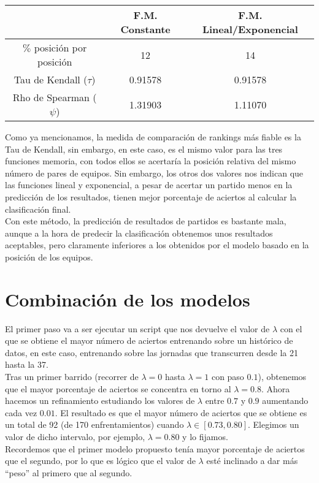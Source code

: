 \begin{center}
	\begin{tabular}{|c|c|c|}
	\hline  & F.M. Constante & F.M. Lineal/Exponencial \\ 
	\hline $\%$ posición por posición & 12 & 14 \\ 
	\hline Tau de Kendall ($\tau$) & 0.91578 & 0.91578 \\ 
	\hline Rho de Spearman ($\psi$) & 1.31903 & 1.11070 \\ 
	\hline 
\end{tabular} 
\end{center}

Como ya mencionamos, la medida de comparación de rankings más fiable es la Tau de Kendall, sin embargo, en este caso, es el mismo valor para las tres funciones memoria, con todos ellos se acertaría la posición relativa del mismo número de pares de equipos. Sin embargo, los otros dos valores nos indican que las funciones lineal y exponencial, a pesar de acertar un partido menos en la predicción de los resultados, tienen mejor porcentaje de aciertos al calcular la clasificación final.\\

Con este método, la predicción de resultados de partidos es bastante mala, aunque a la hora de predecir la clasificación obtenemos unos resultados aceptables, pero claramente inferiores a los obtenidos por el modelo basado en la posición de los equipos. 

\section{Combinación de los modelos}
El primer paso va a ser ejecutar un script que nos devuelve el valor de $\lambda$ con el que se obtiene el mayor número de aciertos entrenando sobre un histórico de datos, en este caso, entrenando sobre las jornadas que transcurren desde la 21 hasta la 37.\\

Tras un primer barrido (recorrer de $\lambda=0$ hasta $\lambda=1$ con paso $0.1$), obtenemos que el mayor porcentaje de aciertos se concentra en torno al $\lambda=0.8$. Ahora hacemos un refinamiento estudiando los valores de $\lambda$ entre $0.7$ y $0.9$ aumentando cada vez $0.01$. El resultado es que el mayor número de aciertos que se obtiene es un total de 92 (de 170 enfrentamientos) cuando $\lambda \in [0.73,0.80]$. Elegimos un valor de dicho intervalo, por ejemplo, $\lambda=0.80$ y lo fijamos. \\
Recordemos que el primer modelo propuesto tenía mayor porcentaje de aciertos que el segundo, por lo que es lógico que el valor de $\lambda$ esté inclinado a dar más ``peso'' al primero que al segundo. \\

